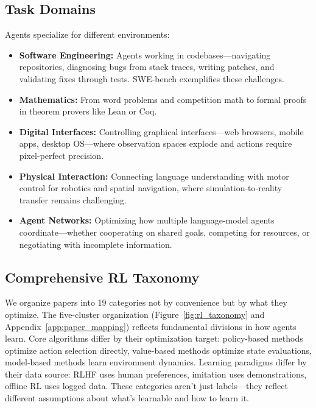 \documentclass[12pt,a4paper]{report}
\theoremstyle{definition}
\begin{document}
\subsection{Task Domains}
Agents specialize for different environments:
\begin{itemize}
    \item \textbf{Software Engineering:} Agents working in codebases---navigating repositories, diagnosing bugs from stack traces, writing patches, and validating fixes through tests. SWE-bench exemplifies these challenges.
    \item \textbf{Mathematics:} From word problems and competition math to formal proofs in theorem provers like Lean or Coq.
    \item \textbf{Digital Interfaces:} Controlling graphical interfaces---web browsers, mobile apps, desktop OS---where observation spaces explode and actions require pixel-perfect precision.
    \item \textbf{Physical Interaction:} Connecting language understanding with motor control for robotics and spatial navigation, where simulation-to-reality transfer remains challenging.
    \item \textbf{Agent Networks:} Optimizing how multiple language-model agents coordinate---whether cooperating on shared goals, competing for resources, or negotiating with incomplete information.
\end{itemize}

\subsection{Comprehensive RL Taxonomy}
We organize papers into 19 categories not by convenience but by what they optimize. The five-cluster organization (Figure~\ref{fig:rl_taxonomy} and Appendix~\ref{app:paper_mapping}) reflects fundamental divisions in how agents learn. Core algorithms differ by their optimization target: policy-based methods optimize action selection directly, value-based methods optimize state evaluations, model-based methods learn environment dynamics. Learning paradigms differ by their data source: RLHF uses human preferences, imitation uses demonstrations, offline RL uses logged data. These categories aren't just labels—they reflect different assumptions about what's learnable and how to learn it.
\end{document}
